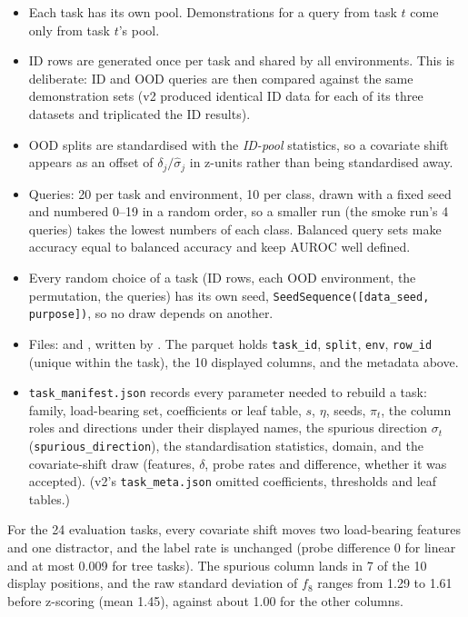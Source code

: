 \documentclass[11pt,a4paper]{article}
\newcommand{\1}{\mathbf{1}}
\theoremstyle{plain}
\theoremstyle{definition}
\theoremstyle{remark}
\begin{document}
\begin{itemize}[nosep]
  \item Each task has its own pool. Demonstrations for a query from task $t$
        come only from task $t$'s pool.
  \item ID rows are generated once per task and shared by all environments.
        This is deliberate: ID and OOD queries are then compared against the
        same demonstration sets (v2 produced identical ID data for each of
        its three datasets and triplicated the ID results).
  \item OOD splits are standardised with the \emph{ID-pool} statistics, so a
        covariate shift appears as an offset of $\delta_j / \hat\sigma_j$ in
        z-units rather than being standardised away.
  \item Queries: 20 per task and environment, 10 per class, drawn with a
        fixed seed and numbered 0--19 in a random order, so a smaller run
        (the smoke run's 4 queries) takes the lowest numbers of each class.
        Balanced query sets make accuracy equal to balanced accuracy and keep
        AUROC well defined.
  \item Every random choice of a task (ID rows, each OOD environment, the
        permutation, the queries) has its own seed,
        \texttt{SeedSequence([data\_seed, purpose])}, so no draw depends on
        another.
  \item Files: 
        and , written by
        . The parquet holds
        \texttt{task\_id}, \texttt{split}, \texttt{env}, \texttt{row\_id}
        (unique within the task), the 10 displayed columns, and the metadata
        above.
  \item \texttt{task\_manifest.json} records every parameter needed to
        rebuild a task: family, load-bearing set, coefficients or leaf
        table, $s$, $\eta$, seeds, $\pi_t$, the column roles and directions
        under their displayed names, the spurious direction $\sigma_t$
        (\texttt{spurious\_direction}), the standardisation statistics, domain,
        and the covariate-shift draw (features, $\delta$, probe rates and
        difference, whether it was accepted). (v2's \texttt{task\_meta.json}
        omitted coefficients, thresholds and leaf tables.)
\end{itemize}

For the 24 evaluation tasks, every covariate shift moves two load-bearing
features and one distractor, and the label rate is unchanged (probe
difference 0 for linear and at most 0.009 for tree tasks). The spurious column lands in 7 of the 10 display
positions, and the raw standard deviation of $f_8$ ranges from 1.29 to 1.61
before z-scoring (mean 1.45), against about 1.00 for the other columns.
\end{document}
